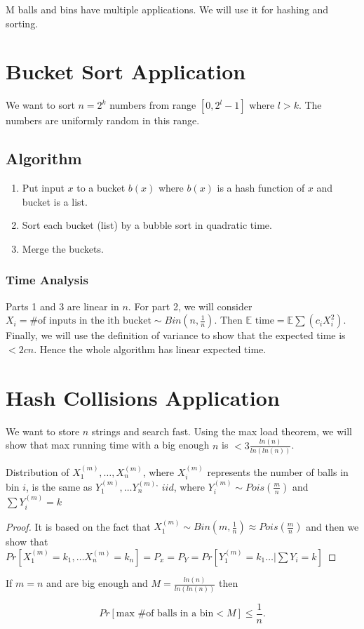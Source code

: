 M balls and bins have multiple applications. We will use it for hashing and sorting.

\section{Bucket Sort Application}

We want to sort $n = 2^k$ numbers from range $[0, 2^l-1]$ where $l > k$. The numbers are uniformly random in this range.

\subsection{Algorithm}

\begin{enumerate}
	\item Put input $x$ to a bucket $b(x)$ where $b(x)$ is a hash function of $x$ and bucket is a list.
	\item Sort each bucket (list) by a bubble sort in quadratic time.
	\item Merge the buckets.
\end{enumerate}

\subsubsection{Time Analysis}

Parts 1 and 3 are linear in $n$. For part 2, we will consider $X_i = \# \text{of inputs in the ith bucket} \sim Bin(n, \frac{1}{n})$. Then $\mathbb{E} \text{ time} = \mathbb{E} \sum (c_iX_i^2)$. Finally, we will use the definition of variance to show that the expected time is $ < 2cn$. Hence the whole algorithm has linear expected time.

\section{Hash Collisions Application}

We want to store $n$ strings and search fast. Using the max load theorem, we will show that max running time with a big enough $n$ is $< 3 \frac{ln(n)}{ln(ln(n))}$.

\begin{thm}
	Distribution of $X^{(m)}_{1}, \dots, X^{(m)}_n$, where $X_i^{(m)} $ represents the number of balls in bin $i$, is the same as $Y^{(m)}_1, \dots Y^{(m),}_n \ iid$, where $Y^{(m)}_i \sim Pois(\frac{m}{n})$ and $\sum Y_i^{(m)} = k$
\end{thm}

\begin{proof}
	It is based on the fact that $X^{(m)}_1 \sim Bin(m, \frac{1}{n}) \approx Pois(\frac{m}{n})$ and then we show that $Pr[X^{(m)}_1 = k_1, \dots X^{(m)}_n = k_n] = P_x = P_Y = Pr[Y^{(m)}_1 = k_1 \dots \vert \sum Y_i = k ]$
\end{proof}

\begin{thm}
	If $m=n$ and are big enough and $M = \frac{ln(n)}{ln(ln(n))}$ then
	
	$$
	Pr[\text{max \# of balls in a bin} < M] \leq \frac{1}{n}.
	$$
\end{thm}
